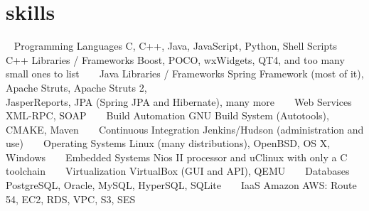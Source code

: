 \section{skills}

\begin{entrylist}
    \entry
        {~}
        {Programming Languages}
        {C, C++, Java, JavaScript, Python, Shell Scripts}
        {~}
    \entry
        {~}
        {C++ Libraries / Frameworks}
        {Boost, POCO, wxWidgets, QT4, and too many small ones to list}
        {~}
    \entry
        {~}
        {Java Libraries / Frameworks}
        {Spring Framework (most of it), Apache Struts, Apache Struts 2,\\
        JasperReports, JPA (Spring JPA and Hibernate), many more}
        {~}
    \entry
        {~}
        {Web Services}
        {XML-RPC, SOAP}
        {~}
    \entry
        {~}
        {Build Automation}
        {GNU Build System (Autotools), CMAKE, Maven}
        {~}
    \entry
        {~}
        {Continuous Integration}
        {Jenkins/Hudson (administration and use)}
        {~}
    \entry
        {~}
        {Operating Systems}
        {Linux (many distributions), OpenBSD, OS X, Windows}
        {~}
    \entry
        {~}
        {Embedded Systems}
        {Nios II processor and uClinux with only a C toolchain}
        {~}
    \entry
        {~}
        {Virtualization}
        {VirtualBox (GUI and API), QEMU}
        {~}
    \entry
        {~}
        {Databases}
        {PostgreSQL, Oracle, MySQL, HyperSQL, SQLite}
        {~}
    \entry
        {~}
        {IaaS}
        {Amazon AWS: Route 54, EC2, RDS, VPC, S3, SES}
        {~}
\end{entrylist}
